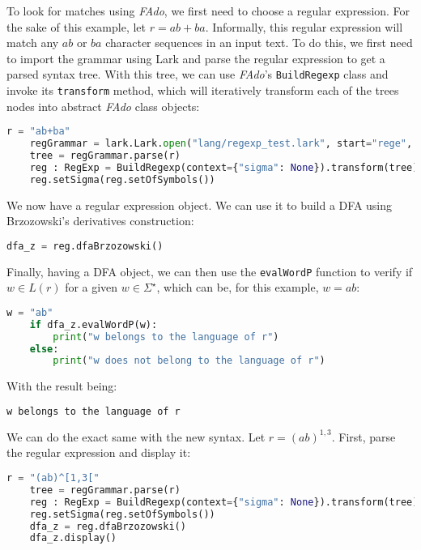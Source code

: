 To look for matches using \textit{FAdo}, we first need to choose a regular expression. For the sake of this example, let $r = ab + ba$. Informally, this regular expression will match any $ab$ or $ba$ character sequences in an input text. To do this, we first need to import the grammar using Lark and parse the regular expression to get a parsed syntax tree. With this tree, we can use \textit{FAdo}'s \texttt{BuildRegexp} class and invoke its \texttt{transform} method, which will iteratively transform each of the trees nodes into abstract \textit{FAdo} class objects:
\begin{lstlisting}[language=Python]
	r = "ab+ba"
	regGrammar = lark.Lark.open("lang/regexp_test.lark", start="rege", parser="lalr")
	tree = regGrammar.parse(r)
	reg : RegExp = BuildRegexp(context={"sigma": None}).transform(tree)
	reg.setSigma(reg.setOfSymbols())
\end{lstlisting}
We now have a regular expression object. We can use it to build a DFA using Brzozowski's derivatives construction:
\begin{lstlisting}[language=Python]
	dfa_z = reg.dfaBrzozowski()
\end{lstlisting}
Finally, having a DFA object, we can then use the \texttt{evalWordP} function to verify if $w \in L(r)$ for a given $w \in \Sigma^\star$, which can be, for this example, $w = ab$:
\begin{lstlisting}[language=Python,label={code:eval_word_dfa}]
	w = "ab"
	if dfa_z.evalWordP(w):
		print("w belongs to the language of r")
	else:
		print("w does not belong to the language of r")
\end{lstlisting}
With the result being:
\begin{lstlisting}[language=Python]
	w belongs to the language of r
\end{lstlisting}
We can do the exact same with the new syntax. Let $r = (ab)^{1,3}$. First, parse the regular expression and display it:
\begin{lstlisting}[language=Python]
	r = "(ab)^[1,3["
	tree = regGrammar.parse(r)
	reg : RegExp = BuildRegexp(context={"sigma": None}).transform(tree)
	reg.setSigma(reg.setOfSymbols())
	dfa_z = reg.dfaBrzozowski()
	dfa_z.display()
\end{lstlisting}

